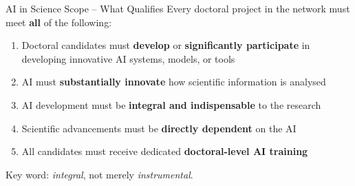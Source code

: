 \documentclass[aspectratio=169]{beamer}
\newcommand{\highlight}[1]{\textcolor{euBlue}{\textbf{#1}}}
\begin{document}
\begin{frame}{AI in Science Scope -- What Qualifies}
Every doctoral project in the network must meet \textbf{all} of the following:
\vspace{4pt}
\begin{enumerate}
  \item Doctoral candidates must \highlight{develop} or \highlight{significantly participate} in developing innovative AI systems, models, or tools
  \item AI must \highlight{substantially innovate} how scientific information is analysed
  \item AI development must be \highlight{integral and indispensable} to the research
  \item Scientific advancements must be \highlight{directly dependent} on the AI
  \item All candidates must receive dedicated \textbf{doctoral-level AI training}
\end{enumerate}
\vspace{6pt}
\textcolor{euBlue}{\small Key word: \emph{integral}, not merely \emph{instrumental}.}
\end{frame}
\end{document}
